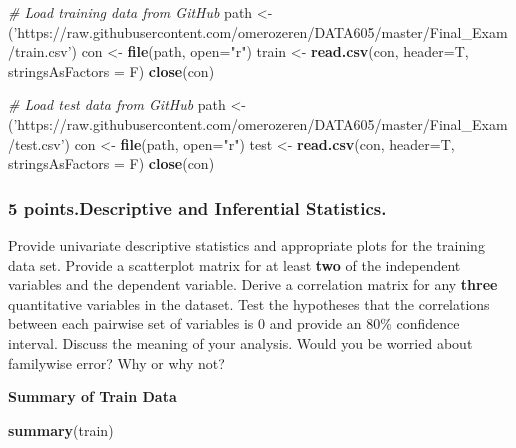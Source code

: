 \documentclass[]{article}
\newenvironment{Shaded}{\begin{snugshade}}{\end{snugshade}}
\newcommand{\KeywordTok}[1]{\textcolor[rgb]{0.13,0.29,0.53}{\textbf{#1}}}
\newcommand{\DataTypeTok}[1]{\textcolor[rgb]{0.13,0.29,0.53}{#1}}
\newcommand{\StringTok}[1]{\textcolor[rgb]{0.31,0.60,0.02}{#1}}
\newcommand{\CommentTok}[1]{\textcolor[rgb]{0.56,0.35,0.01}{\textit{#1}}}
\newcommand{\NormalTok}[1]{#1}
\begin{document}
\begin{Shaded}
\begin{Highlighting}[]
\CommentTok{# Load training data from GitHub}
\NormalTok{path <-}\StringTok{ }\NormalTok{(}\StringTok{'https://raw.githubusercontent.com/omerozeren/DATA605/master/Final_Exam/train.csv'}\NormalTok{)}
\NormalTok{con <-}\StringTok{ }\KeywordTok{file}\NormalTok{(path, }\DataTypeTok{open=}\StringTok{"r"}\NormalTok{)}
\NormalTok{train <-}\StringTok{ }\KeywordTok{read.csv}\NormalTok{(con, }\DataTypeTok{header=}\NormalTok{T, }\DataTypeTok{stringsAsFactors =}\NormalTok{ F)}
\KeywordTok{close}\NormalTok{(con)}

\CommentTok{# Load test data from GitHub}
\NormalTok{path <-}\StringTok{ }\NormalTok{(}\StringTok{'https://raw.githubusercontent.com/omerozeren/DATA605/master/Final_Exam/test.csv'}\NormalTok{)}
\NormalTok{con <-}\StringTok{ }\KeywordTok{file}\NormalTok{(path, }\DataTypeTok{open=}\StringTok{"r"}\NormalTok{)}
\NormalTok{test <-}\StringTok{ }\KeywordTok{read.csv}\NormalTok{(con, }\DataTypeTok{header=}\NormalTok{T, }\DataTypeTok{stringsAsFactors =}\NormalTok{ F)}
\KeywordTok{close}\NormalTok{(con)}
\end{Highlighting}
\end{Shaded}

\subsubsection{5 points.Descriptive and Inferential
Statistics.}\label{points.descriptive-and-inferential-statistics.}

Provide univariate descriptive statistics and appropriate plots for the
training data set. Provide a scatterplot matrix for at least
\textbf{two} of the independent variables and the dependent variable.
Derive a correlation matrix for any \textbf{three} quantitative
variables in the dataset. Test the hypotheses that the correlations
between each pairwise set of variables is 0 and provide an 80\%
confidence interval. Discuss the meaning of your analysis. Would you be
worried about familywise error? Why or why not?

\textbf{Summary of Train Data}

\begin{Shaded}
\begin{Highlighting}[]
\KeywordTok{summary}\NormalTok{(train)}
\end{Highlighting}
\end{Shaded}
\end{document}
